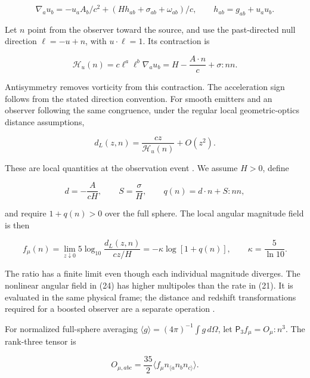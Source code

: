 \documentclass[aps,prd,reprint,onecolumn,11pt,nofootinbib,notitlepage]{revtex4-2}
\begin{document}
\begin{equation}
 \nabla_a u_b=-u_aA_b/c^2+(Hh_{ab}+\sigma_{ab}+\omega_{ab})/c,\qquad
 h_{ab}=g_{ab}+u_au_b.
 \tag{20}
\end{equation}

Let \(n\) point from the observer toward the source, and use the past-directed null direction \(\ell=-u+n\), with \(u\cdot\ell=1\). Its contraction is

\begin{equation}
 \mathcal H_u(n)=c\ell^a\ell^b\nabla_a u_b
 =H-\frac{A\cdot n}{c}+\sigma:nn.
 \tag{21}
\end{equation}

Antisymmetry removes vorticity from this contraction. The acceleration sign follows from the stated direction convention. For smooth emitters and an observer following the same congruence, under the regular local geometric-optics distance assumptions,

\begin{equation}
 d_L(z,n)=\frac{cz}{\mathcal H_u(n)}+O(z^2).
 \tag{22}
\end{equation}

These are local quantities at the observation event \cite{KristianSachs1966,Heinesen2021}. We assume \(H>0\), define

\begin{equation}
 d=-\frac A{cH},\qquad S=\frac\sigma H,\qquad q(n)=d\cdot n+S:nn,
 \tag{23}
\end{equation}

and require \(1+q(n)>0\) over the full sphere. The local angular magnitude field is then

\begin{equation}
 f_\mu(n)=\lim_{z\downarrow0}5\log_{10}
   \frac{d_L(z,n)}{cz/H}
 =-\kappa\log[1+q(n)],\qquad \kappa=\frac5{\ln10}.
 \tag{24}
\end{equation}

The ratio has a finite limit even though each individual magnitude diverges. The nonlinear angular field in (24) has higher multipoles than the rate in (21). It is evaluated in the same physical frame; the distance and redshift transformations required for a boosted observer are a separate operation \cite{Maartens2024}.

For normalized full-sphere averaging \(\langle g\rangle=(4\pi)^{-1}\int g\,d\Omega\), let \(\mathsf P_3f_\mu=O_\mu:n^3\). The rank-three tensor is

\begin{equation}
 O_{\mu,abc}=\frac{35}{2}
       \langle f_\mu n_{\langle a}n_bn_{c\rangle}\rangle.
 \tag{25}
\end{equation}
\end{document}

